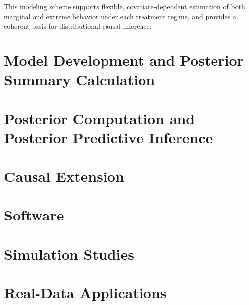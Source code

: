 \documentclass[article]{jss}\usepackage[]{graphicx}\usepackage[]{xcolor}
\begin{document}
This modeling scheme supports flexible, covariate-dependent estimation of both marginal and extreme behavior under each treatment regime, and provides a coherent basis for distributional causal inference.


\section{Model Development and Posterior Summary Calculation}
\label{sec:model}

\section{Posterior Computation and Posterior Predictive Inference}
\label{sec:posterior}

\section{Causal Extension}
\label{sec:causal}

\section{Software}
\label{sec:software}

\section{Simulation Studies}

\section{Real-Data Applications}

\end{document}
